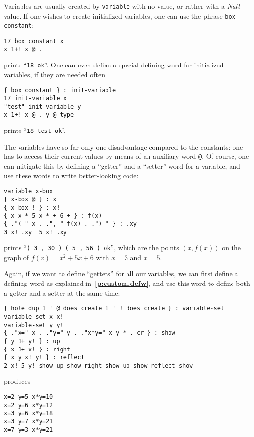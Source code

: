 \documentclass[12pt,oneside]{article}
\def\refpoint#1{{\rm\textbf{\ref{#1}}}}
\let\ptref=\refpoint
\begin{document}
Variables are usually created by {\tt variable} with no value, or rather with a {\em Null\/} value. If one wishes to create initialized variables, one can use the phrase {\tt box constant}:
\begin{verbatim}
17 box constant x
x 1+! x @ .
\end{verbatim}
prints ``{\tt 18 ok}''. One can even define a special defining word for initialized variables, if they are needed often:
\begin{verbatim}
{ box constant } : init-variable
17 init-variable x
"test" init-variable y
x 1+! x @ . y @ type
\end{verbatim}
prints ``{\tt 18 test ok}''.

The variables have so far only one disadvantage compared to the constants: one has to access their current values by means of an auxiliary word {\tt @}. Of course, one can mitigate this by defining a ``getter'' and a ``setter'' word for a variable, and use these words to write better-looking code:
\begin{verbatim}
variable x-box
{ x-box @ } : x
{ x-box ! } : x!
{ x x * 5 x * + 6 + } : f(x)
{ ."( " x . .", " f(x) . .") " } : .xy
3 x! .xy  5 x! .xy
\end{verbatim}
prints ``{\tt ( 3 , 30 ) ( 5 , 56 ) ok}'', which are the points $(x,f(x))$ on the graph of $f(x)=x^2+5x+6$ with $x=3$ and $x=5$.

Again, if we want to define ``getters'' for all our variables, we can first define a defining word as explained in~\ptref{p:custom.defw}, and use this word to define both a getter and a setter at the same time:
\begin{verbatim}
{ hole dup 1 ' @ does create 1 ' ! does create } : variable-set
variable-set x x!
variable-set y y!
{ ."x=" x . ."y=" y . ."x*y=" x y * . cr } : show
{ y 1+ y! } : up
{ x 1+ x! } : right
{ x y x! y! } : reflect
2 x! 5 y! show up show right show up show reflect show
\end{verbatim}
produces
\begin{verbatim}
x=2 y=5 x*y=10 
x=2 y=6 x*y=12 
x=3 y=6 x*y=18 
x=3 y=7 x*y=21 
x=7 y=3 x*y=21 
\end{verbatim}
\end{document}
